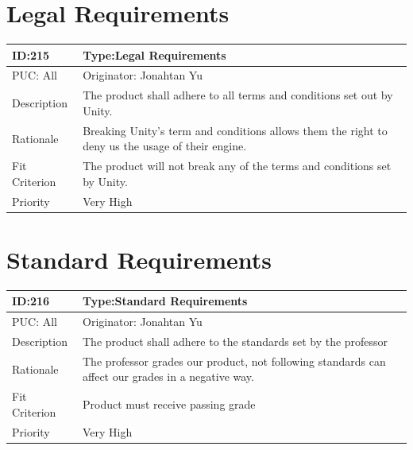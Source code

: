 \documentclass{article}
\begin{document}
\section{Legal Requirements}
\begin{table}[H]
    \begin{tabular}{|l|l|l|}
    \hline
    ID:215 & \multicolumn{2}{l|}{Type:Legal Requirements} \\ \hline
    PUC: All & \multicolumn{2}{l|}{Originator: Jonahtan Yu} \\ \hline
    Description & \multicolumn{2}{m{0.85\textwidth}|}{The product shall adhere to all terms and conditions set out by Unity.} \\ \hline
    Rationale & \multicolumn{2}{m{0.85\textwidth}|}{Breaking Unity’s term and conditions allows them the right to deny us the usage of their engine.} \\ \hline
    Fit Criterion & \multicolumn{2}{m{0.85\textwidth}|}{The product will not break any of the terms and conditions set by Unity.} \\ \hline
    Priority& \multicolumn{2}{m{0.85\textwidth}|}{Very High} \\ \hline
    \end{tabular}
    \end{table}

\section{Standard Requirements}

    \begin{table}[H]
    \begin{tabular}{|l|l|l|}
    \hline
    ID:216 & \multicolumn{2}{l|}{Type:Standard Requirements} \\ \hline
    PUC: All & \multicolumn{2}{l|}{Originator: Jonahtan Yu} \\ \hline
    Description & \multicolumn{2}{m{0.85\textwidth}|}{The product shall adhere to the standards set by the professor} \\ \hline
    Rationale & \multicolumn{2}{m{0.85\textwidth}|}{The professor grades our product, not following standards can affect our grades in a negative way.} \\ \hline
    Fit Criterion & \multicolumn{2}{m{0.85\textwidth}|}{Product must receive passing grade} \\ \hline
    Priority& \multicolumn{2}{m{0.85\textwidth}|}{Very High} \\ \hline
    \end{tabular}
    \end{table} 
    
\end{document}
